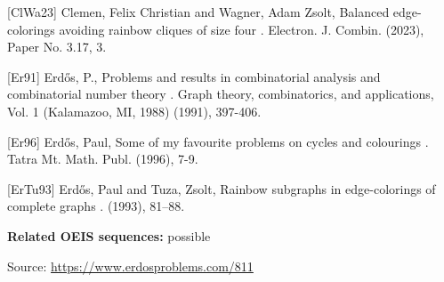 \documentclass{article}
\begin{document}
[ClWa23] Clemen, Felix Christian and Wagner, Adam Zsolt, Balanced edge-colorings avoiding rainbow cliques of size four . Electron. J. Combin. (2023), Paper No. 3.17, 3.

[Er91] Erd\H{o}s, P., Problems and results in combinatorial analysis and combinatorial number theory . Graph theory, combinatorics, and applications, Vol. 1 (Kalamazoo, MI, 1988) (1991), 397-406.

[Er96] Erd\H{o}s, Paul, Some of my favourite problems on cycles and colourings . Tatra Mt. Math. Publ. (1996), 7-9.

[ErTu93] Erd\H{o}s, Paul and Tuza, Zsolt, Rainbow subgraphs in edge-colorings of complete graphs . (1993), 81--88.

\noindent\textbf{Related OEIS sequences:} possible


\bigskip
\noindent\small{Source: \url{https://www.erdosproblems.com/811}}
\end{document}
